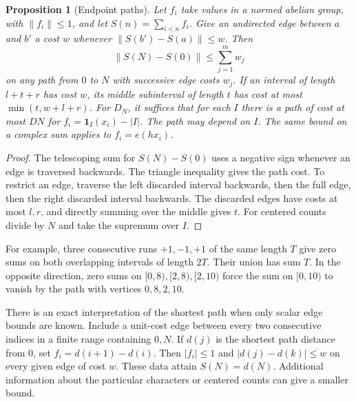 \documentclass[11pt]{article}
\newtheorem{proposition}[theorem]{Proposition}
\begin{document}
\begin{proposition}[Endpoint paths]\label{prop:path}
Let \(f_i\) take values in a normed abelian group, with \(\|f_i\|\le1\), and let \(S(n)=\sum_{i<n}f_i\). Give an undirected edge between \(a\) and \(b'\) a cost \(w\) whenever \(\|S(b')-S(a)\|\le w\). Then
\[
 \|S(N)-S(0)\|\le\sum_{j=1}^m w_j
\]
on any path from \(0\) to \(N\) with successive edge costs \(w_j\). If an interval of length \(l+t+r\) has cost \(w\), its middle subinterval of length \(t\) has cost at most \(\min(t,w+l+r)\). For \(D_N\), it suffices that for each \(I\) there is a path of cost at most \(DN\) for \(f_i=\mathbf1_I(x_i)-|I|\). The path may depend on \(I\). The same bound on a complex sum applies to \(f_i=e(hx_i)\).
\end{proposition}
\begin{proof}
The telescoping sum for \(S(N)-S(0)\) uses a negative sign whenever an edge is traversed backwards. The triangle inequality gives the path cost. To restrict an edge, traverse the left discarded interval backwards, then the full edge, then the right discarded interval backwards. The discarded edges have costs at most \(l,r\), and directly summing over the middle gives \(t\). For centered counts divide by \(N\) and take the supremum over \(I\).
\end{proof}
For example, three consecutive runs \(+1,-1,+1\) of the same length \(T\) give zero sums on both overlapping intervals of length \(2T\). Their union has sum \(T\). In the opposite direction, zero sums on \([0,8),[2,8),[2,10)\) force the sum on \([0,10)\) to vanish by the path with vertices \(0,8,2,10\).

There is an exact interpretation of the shortest path when only scalar edge bounds are known. Include a unit-cost edge between every two consecutive indices in a finite range containing \(0,N\). If \(d(j)\) is the shortest path distance from \(0\), set \(f_i=d(i+1)-d(i)\). Then \(|f_i|\le1\) and \(|d(j)-d(k)|\le w\) on every given edge of cost \(w\). These data attain \(S(N)=d(N)\). Additional information about the particular characters or centered counts can give a smaller bound.
\end{document}
